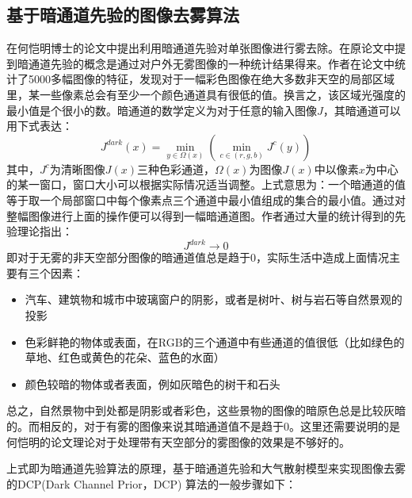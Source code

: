 \documentclass[12pt]{article}
\begin{document}
\subsection{基于暗通道先验的图像去雾算法}
在何恺明博士的论文中提出利用暗通道先验对单张图像进行雾去除。在原论文中提到暗通道先验的概念是通过对户外无雾图像的一种统计结果得来。作者在论文中统计了5000多幅图像的特征，发现对于一幅彩色图像在绝大多数非天空的局部区域里，某一些像素总会有至少一个颜色通道具有很低的值。换言之，该区域光强度的最小值是个很小的数。暗通道的数学定义为对于任意的输入图像$J$，其暗通道可以用下式表达：
\begin{equation}
J^{dark}(x)=\min _{y \in \Omega(x)}\left(\min _{c \in(r, g, b)} J^{c}(y)\right)
\end{equation}
其中，$J^c$为清晰图像$J(x)$三种色彩通道，$\Omega(x)$为图像$J(x)$中以像素$x$为中心的某一窗口，窗口大小可以根据实际情况适当调整。上式意思为：一个暗通道的值等于取一个局部窗口中每个像素点三个通道中最小值组成的集合的最小值。通过对整幅图像进行上面的操作便可以得到一幅暗通道图。作者通过大量的统计得到的先验理论指出：
\begin{equation}
    J^{dark} \to 0
\end{equation}
即对于无雾的非天空部分图像的暗通道值总是趋于0，实际生活中造成上面情况主要有三个因素：
\begin{itemize}
    \item 汽车、建筑物和城市中玻璃窗户的阴影，或者是树叶、树与岩石等自然景观的投影
    \item 色彩鲜艳的物体或表面，在RGB的三个通道中有些通道的值很低（比如绿色的草地、红色或黄色的花朵、蓝色的水面）
    \item 颜色较暗的物体或者表面，例如灰暗色的树干和石头
\end{itemize}
总之，自然景物中到处都是阴影或者彩色，这些景物的图像的暗原色总是比较灰暗的。而相反的，对于有雾的图像来说其暗通道值不是趋于0。这里还需要说明的是何恺明的论文理论对于处理带有天空部分的雾图像的效果是不够好的。


上式即为暗通道先验算法的原理，基于暗通道先验和大气散射模型来实现图像去雾的DCP(Dark Channel Prior，DCP) 算法的一般步骤如下：
\end{document}
